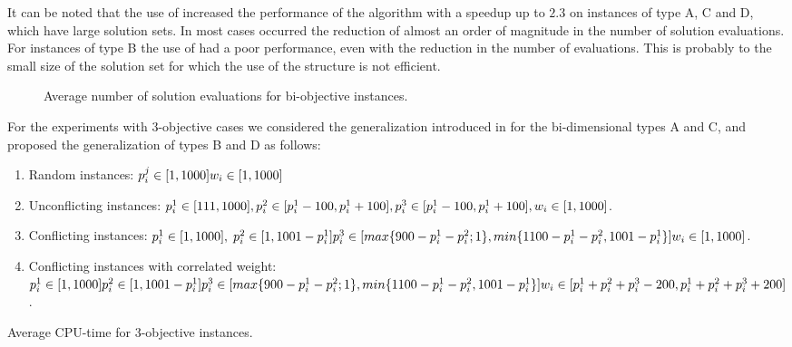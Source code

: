 It can be noted that the use of  
increased the performance of
the algorithm with a speedup up to $2.3$ on instances
of type A, C and D, which have large solution sets.
In most cases occurred the reduction of almost
an order of magnitude in the number of solution evaluations.
For instances of type B the use of  had a poor performance,
even with the reduction in the number of evaluations.
This is probably to the small size of the solution set
for which the use of the structure is not efficient.

\begin{figure}[H]
  
  \caption{Average number of solution evaluations for bi-objective instances.}
  \label{fig:cmp2dim}
\end{figure}

For the experiments with $3$-objective cases
we considered the generalization introduced in \cite{bazgan2009}
for the bi-dimensional types A and C,
and proposed the generalization of types B and D as follows:
\begin{enumerate}[Type A)]
  \item Random instances: $
    p^j_i \in [1, 1000]\\
    w_i \in [1,1000]$
  \item Unconflicting instances: $
    p^1_i \in [111, 1000],\\
    p^2_i \in [p^1_i - 100, p^1_i + 100],\\
    p^3_i \in [p^1_i - 100, p^1_i + 100],\\
    w_i \in [1,1000]$.
  \item Conflicting instances: $
    p^1_i \in [1, 1000], \;
    p^2_i \in [1, 1001 - p^1_i] \\
    p^3_i \in [max\{900-p^1_i-p^2_i;1\}, min\{1100-p^1_i-p^2_i, 1001-p^1_i\}]\\
    w_i \in [1,1000]$.
  \item Conflicting instances with correlated weight: $
    p^1_i \in [1, 1000]\\
    p^2_i \in [1, 1001 - p^1_i] \\
    p^3_i \in [max\{900-p^1_i-p^2_i;1\}, min\{1100-p^1_i-p^2_i, 1001-p^1_i\}]\\
    w_i \in [p^1_i+p^2_i+p^3_i-200, p^1_i+p^2_i+p^3_i+200]$.
\end{enumerate}

\begin{table}[H]
  \centering
  
  \caption{Average CPU-time for 3-objective instances.}
  \label{tab:cpu3dim}
\end{table}

